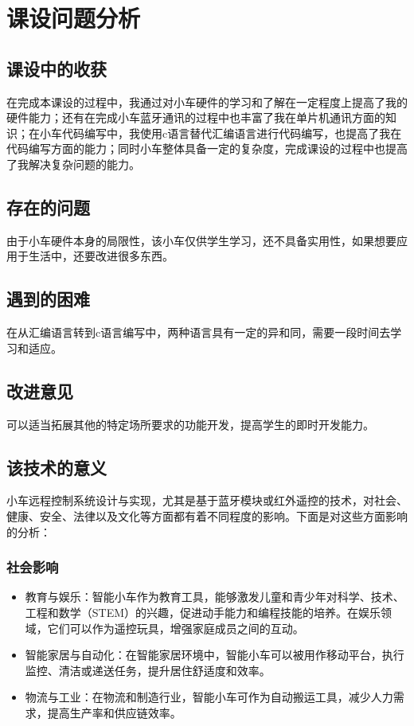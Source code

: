 \section{课设问题分析}
\subsection{课设中的收获}
在完成本课设的过程中，我通过对小车硬件的学习和了解在一定程度上提高了我的硬件能力；还有在完成小车蓝牙通讯的过程中也丰富了我在单片机通讯方面的知识；在小车代码编写中，我使用c语言替代汇编语言进行代码编写，也提高了我在代码编写方面的能力；同时小车整体具备一定的复杂度，完成课设的过程中也提高了我解决复杂问题的能力。
\subsection{存在的问题}
由于小车硬件本身的局限性，该小车仅供学生学习，还不具备实用性，如果想要应用于生活中，还要改进很多东西。
\subsection{遇到的困难}
在从汇编语言转到c语言编写中，两种语言具有一定的异和同，需要一段时间去学习和适应。
\subsection{改进意见}
可以适当拓展其他的特定场所要求的功能开发，提高学生的即时开发能力。
\subsection{该技术的意义}
小车远程控制系统设计与实现，尤其是基于蓝牙模块或红外遥控的技术，对社会、健康、安全、法律以及文化等方面都有着不同程度的影响。下面是对这些方面影响的分析：
\subsubsection{社会影响}
\begin{itemize}
    \item 教育与娱乐：智能小车作为教育工具，能够激发儿童和青少年对科学、技术、工程和数学（STEM）的兴趣，促进动手能力和编程技能的培养。在娱乐领域，它们可以作为遥控玩具，增强家庭成员之间的互动。
    \item 智能家居与自动化：在智能家居环境中，智能小车可以被用作移动平台，执行监控、清洁或递送任务，提升居住舒适度和效率。
    \item 物流与工业：在物流和制造行业，智能小车可作为自动搬运工具，减少人力需求，提高生产率和供应链效率。
\end{itemize}

